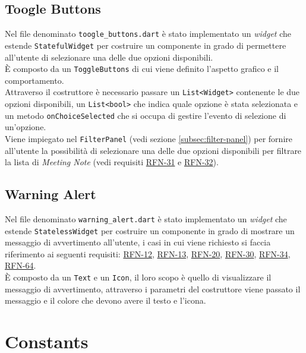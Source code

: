 \subsection{Toogle Buttons}
\label{subsec:toogle-buttons}

Nel file denominato \lstinline{toogle_buttons.dart} è stato implementato un \emph{widget} che estende \lstinline{StatefulWidget} per costruire un componente in grado di permettere all'utente di selezionare una delle due opzioni disponibili.\\
È composto da un \lstinline{ToggleButtons}\cite{site:toggle-buttons} di cui viene definito l'aspetto grafico e il comportamento.\\
Attraverso il costruttore è necessario passare un \lstinline{List<Widget>} contenente le due opzioni disponibili, un \lstinline{List<bool>} che indica quale opzione è stata selezionata e un metodo \lstinline{onChoiceSelected} che si occupa di gestire l'evento di selezione di un'opzione.\\
Viene impiegato nel \lstinline{FilterPanel} (vedi sezione \ref{subsec:filter-panel}) per fornire all'utente la possibilità di selezionare una delle due opzioni disponibili per filtrare la lista di \emph{Meeting Note} (vedi requisiti \hyperref[RFN-31]{RFN-31} e \hyperref[RFN-32]{RFN-32}).

\subsection{Warning Alert}
\label{subsec:warning-alert}

Nel file denominato \lstinline{warning_alert.dart} è stato implementato un \emph{widget} che estende \lstinline{StatelessWidget} per costruire un componente in grado di mostrare un messaggio di avvertimento all'utente, i casi in cui viene richiesto si faccia riferimento ai seguenti requisiti: \hyperref[RFN-12]{RFN-12}, \hyperref[RFN-13]{RFN-13}, \hyperref[RFN-20]{RFN-20}, \hyperref[RFN-30]{RFN-30}, \hyperref[RFN-34]{RFN-34}, \hyperref[RFN-64]{RFN-64}. \\
È composto da un \lstinline{Text}\cite{site:text} e un \lstinline{Icon}\cite{site:icon}, il loro scopo è quello di visualizzare il messaggio di avvertimento, attraverso i parametri del costruttore viene passato il messaggio e il colore che devono avere il testo e l'icona. 

\section{Constants}
\label{sec:constants}


